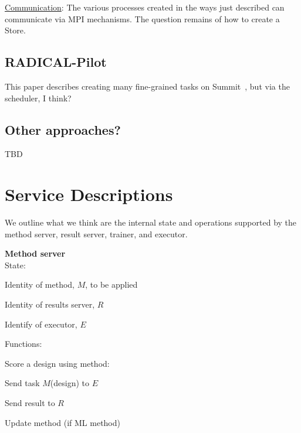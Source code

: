 \documentclass[10pt]{article}
\begin{document}
\underline{Communication}: The various processes created in the ways just described can communicate via MPI mechanisms.
The question remains of how to create a Store.

\subsection{RADICAL-Pilot}

This paper describes creating many fine-grained tasks on Summit~\cite{turilli2019characterizing}, but via the scheduler, I think?

\subsection{Other approaches?}

TBD




\appendix
\appendixpage
\section{Service Descriptions}\label{sec:details}

We outline what we think are the internal state and operations supported by the method server, result server, trainer, and executor.

\vspace{3ex}

\noindent
\textbf{Method server}\\
State:
\begin{compactitem}
\item
Identity of method, $M$, to be applied
\item
Identity of results server, $R$
\item
Identify of executor, $E$
\end{compactitem}
Functions:
\begin{compactitem}
\item 
Score a design using method:
\begin{compactitem}
\item
Send task $M$(design) to $E$
\item
Send result to $R$
\end{compactitem}
\item
Update method (if ML method) 
\end{compactitem}
\end{document}
